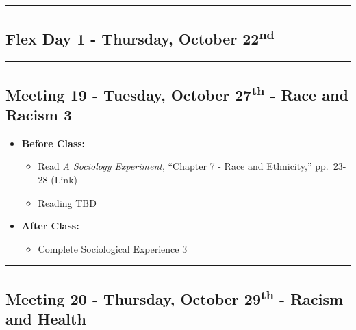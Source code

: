 \documentclass[
]{book}
\providecommand{\tightlist}{%
  \setlength{\itemsep}{0pt}\setlength{\parskip}{0pt}}
\begin{document}
\begin{center}\rule{0.5\linewidth}{0.5pt}\end{center}

\hypertarget{flex-day-1---thursday-october-22nd}{%
\subsection*{\texorpdfstring{Flex Day 1 - Thursday, October 22\textsuperscript{nd}}{Flex Day 1 - Thursday, October 22nd}}\label{flex-day-1---thursday-october-22nd}}

\begin{center}\rule{0.5\linewidth}{0.5pt}\end{center}

\hypertarget{meeting-19---tuesday-october-27th---race-and-racism-3}{%
\subsection*{\texorpdfstring{Meeting 19 - Tuesday, October 27\textsuperscript{th} - Race and Racism 3}{Meeting 19 - Tuesday, October 27th - Race and Racism 3}}\label{meeting-19---tuesday-october-27th---race-and-racism-3}}

\begin{itemize}
\tightlist
\item
  \textbf{Before Class:}

  \begin{itemize}
  \tightlist
  \item
    Read \emph{A Sociology Experiment}, ``Chapter 7 - Race and Ethnicity,'' pp.~23-28 (Link)
  \item
    Reading TBD
  \end{itemize}
\item
  \textbf{After Class:}

  \begin{itemize}
  \tightlist
  \item
    Complete Sociological Experience 3
  \end{itemize}
\end{itemize}

\begin{center}\rule{0.5\linewidth}{0.5pt}\end{center}

\hypertarget{meeting-20---thursday-october-29th---racism-and-health}{%
\subsection*{\texorpdfstring{Meeting 20 - Thursday, October 29\textsuperscript{th} - Racism and Health}{Meeting 20 - Thursday, October 29th - Racism and Health}}\label{meeting-20---thursday-october-29th---racism-and-health}}
\end{document}
